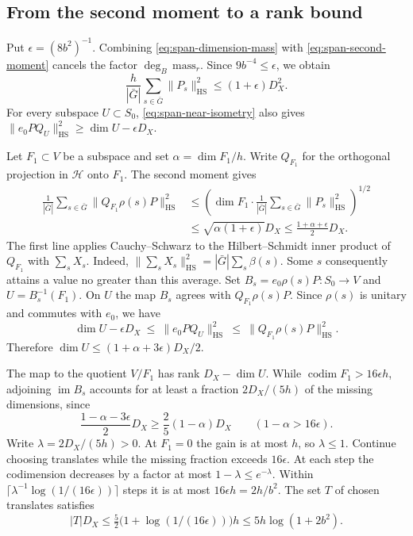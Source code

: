 \subsection{From the second moment to a rank bound}

Put \(\epsilon=(8b^2)^{-1}\). Combining \eqref{eq:span-dimension-mass}
with \eqref{eq:span-second-moment} cancels the factor
\(\deg_B\,\mathrm{mass}_r\). Since \(9b^{-4}\le\epsilon\), we obtain
\begin{equation}\label{eq:span-moment-comparison}
 \frac{h}{|\bar G|}\sum_{s\in\bar G}\|P_s\|_{\mathrm{HS}}^2
    \leq (1+\epsilon)D_X^2.
\end{equation}
For every subspace \(U\subset S_0\), \eqref{eq:span-near-isometry}
also gives \(\|e_0P Q_U\|_{\mathrm{HS}}^2\geq\dim U-\epsilon D_X\).

Let \(F_1\subset V\) be a subspace and set \(\alpha=\dim F_1/h\).
Write \(Q_{F_1}\) for the orthogonal projection in \(\mathcal H\) onto \(F_1\).
The second moment gives
\begin{align*}
 \frac1{|\bar G|}\sum_{s\in\bar G}\|Q_{F_1}\rho(s)P\|_{\mathrm{HS}}^2
 &\leq
 \left(\dim F_1\cdot
        \frac1{|\bar G|}\sum_{s\in\bar G}\|P_s\|_{\mathrm{HS}}^2\right)^{1/2}\\
 &\leq \sqrt{\alpha(1+\epsilon)}D_X
 \leq \frac{1+\alpha+\epsilon}{2}D_X.
\end{align*}
The first line applies Cauchy--Schwarz to the Hilbert--Schmidt inner
product of \(Q_{F_1}\) with \(\sum_s X_s\). Indeed,
\(\|\sum_s X_s\|_{\mathrm{HS}}^2=|\bar G|\sum_s\beta(s)\).
Some \(s\) consequently attains a value no greater than this average.
Set \(B_s=e_0\rho(s)P\colon S_0\to V\) and \(U=B_s^{-1}(F_1)\).
On \(U\) the map \(B_s\) agrees with \(Q_{F_1}\rho(s)P\). Since \(\rho(s)\)
is unitary and commutes with \(e_0\), we have
\[
 \dim U-\epsilon D_X
 \ \leq\ \|e_0P Q_U\|_{\mathrm{HS}}^2
 \ \leq\ \|Q_{F_1}\rho(s)P\|_{\mathrm{HS}}^2.
\]
Therefore \(\dim U\le(1+\alpha+3\epsilon)D_X/2\).

The map to the quotient \(V/F_1\) has rank \(D_X-\dim U\).
While \(\operatorname{codim}F_1>16\epsilon h\), adjoining
\(\operatorname{im}B_s\) accounts for at least a fraction \(2D_X/(5h)\)
of the missing dimensions, since
\[
 \frac{1-\alpha-3\epsilon}{2}D_X
 \ge \frac25(1-\alpha)D_X
 \qquad (1-\alpha>16\epsilon).
\]
Write \(\lambda=2D_X/(5h)>0\). At \(F_1=0\) the gain is at most \(h\),
so \(\lambda\le1\). Continue choosing translates while the missing fraction
exceeds \(16\epsilon\). At each step the codimension decreases by a
factor at most \(1-\lambda\le e^{-\lambda}\). Within
\(\lceil\lambda^{-1}\log(1/(16\epsilon))\rceil\) steps it is at most
\(16\epsilon h=2h/b^2\). The set \(T\) of chosen translates satisfies
\[
  |T|D_X\le\tfrac52\bigl(1+\log(1/(16\epsilon))\bigr)h
               \le 5h\log(1+2b^2).
\]


